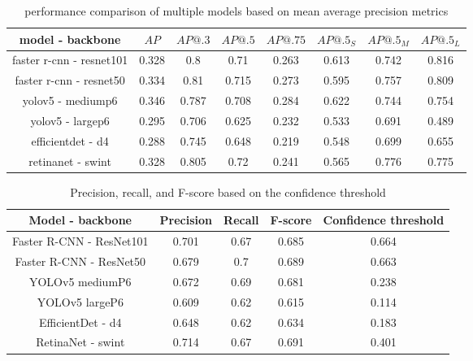 \begin{table}
    \begin{tabular}{c||c|c|c|c|c|c|c}
        model - backbone & $AP$  & $AP@.3$ & $AP@.5$ & $AP@.75$ & $AP@.5_S$ & $AP@.5_M$ & $AP@.5_L$ \\ \hline \hline
        faster r-cnn - resnet101 & 0.328& 0.8 & 0.71 & 0.263 & 0.613 & 0.742 & 0.816 \\ \hline 
        faster r-cnn - resnet50 & 0.334& 0.81 & 0.715 & 0.273 & 0.595 & 0.757 & 0.809 \\ \hline
        yolov5 - mediump6 & 0.346& 0.787 & 0.708 & 0.284 & 0.622 & 0.744 & 0.754 \\ \hline
        yolov5 - largep6 & 0.295& 0.706 & 0.625 & 0.232 & 0.533 & 0.691 & 0.489 \\ \hline
        efficientdet - d4 & 0.288& 0.745 & 0.648 & 0.219 & 0.548 & 0.699 & 0.655 \\ \hline
        retinanet - swint & 0.328& 0.805 & 0.72 & 0.241 & 0.565 & 0.776 & 0.775 \\ 
    \end{tabular}
    \caption{performance comparison of multiple models based on mean average precision metrics}
    \label{tab:model_comparison4k}
\end{table}

\begin{table}
    \begin{tabular}{c||c|c|c|c}
        Model - backbone & Precision & Recall & F-score & Confidence threshold \\ \hline \hline
        Faster R-CNN - ResNet101 & 0.701 & 0.67 & 0.685 & 0.664 \\ \hline
        Faster R-CNN - ResNet50 & 0.679 & 0.7 & 0.689 & 0.663 \\ \hline
        YOLOv5 mediumP6 & 0.672 & 0.69 & 0.681 & 0.238 \\ \hline
        YOLOv5 largeP6 & 0.609 & 0.62 & 0.615 & 0.114 \\ \hline
        EfficientDet - d4 & 0.648 & 0.62 & 0.634 & 0.183 \\ \hline
        RetinaNet - swint & 0.714 & 0.67 & 0.691 & 0.401 \\ \hline
    \end{tabular}
    \caption{Precision, recall, and F-score based on the confidence threshold}
    \label{tab:model_prf4k}
\end{table}